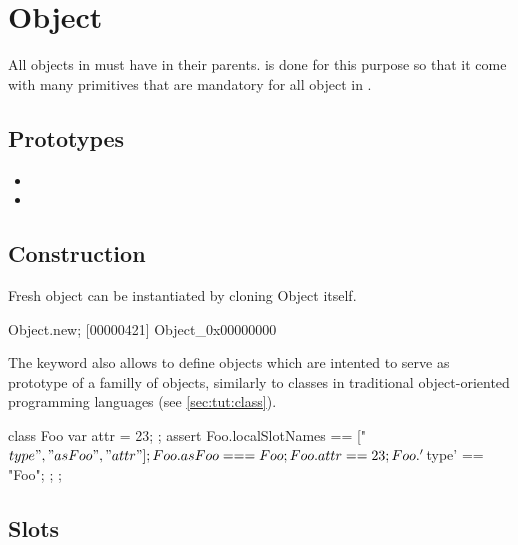 \section{Object}

All objects in \us must have  in their
parents.  is done for this purpose so that it come
with many primitives that are mandatory for all object in \us.

\subsection{Prototypes}

\begin{itemize}
\item {}
\item {}
\end{itemize}

\subsection{Construction}

Fresh object can be instantiated by cloning Object itself.

\begin{urbiscript}
Object.new;
[00000421] Object_0x00000000
\end{urbiscript}

The keyword  also allows to define objects which are
intented to serve as prototype of a familly of objects, similarly to
classes in traditional object-oriented programming languages (see
\autoref{sec:tut:class}).

\begin{urbiscript}[firstnumber=last]
{
  class Foo
  {
    var attr = 23;
  };
  assert
  {
    Foo.localSlotNames == ["$type", "asFoo", "attr"];
    Foo.asFoo === Foo;
    Foo.attr == 23;
    Foo.'$type' == "Foo";
  };
};
\end{urbiscript} %


\subsection{Slots}

